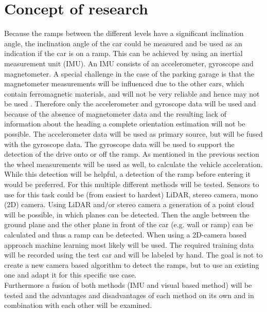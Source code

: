 \documentclass{paper}
\begin{document}
\section{Concept of research}
Because the ramps between the different levels have a significant inclination angle, the inclination angle of the car could be measured and be used as an indication if the car is on a ramp. This can be achieved by using an inertial measurement unit (IMU). An IMU consists of an accelerometer, gyroscope and magnetometer. A special challenge in the case of the parking garage is that the magnetometer measurements will be influenced due to the other cars, which contain ferromagnetic materials, and will not be very reliable and hence may not be used \cite{6418880}.
Therefore only the accelerometer and gyroscope data will be used and because of the absence of magnetometer data and the resulting lack of information about the heading a complete orientation estimation will not be possible. The accelerometer data will be used as primary source, but will be fused with the gyroscope data. The gyroscope data will be used to support the detection of the drive onto or off the ramp. As mentioned in the previous section the wheel measurements will be used as well, to calculate the vehicle acceleration.\\
While this detection will be helpful, a detection of the ramp before entering it would be preferred. For this multiple different methods will be tested. Sensors to use for this task could be (from easiest to hardest) LiDAR, stereo camera, mono (2D) camera. Using LiDAR and/or stereo camera a generation of a point cloud will be possible, in which planes can be detected. Then the angle between the ground plane and the other plane in front of the car (e.g. wall or ramp) can be calculated and thus a ramp can be detected. When using a 2D-camera based approach machine learning most likely will be used. The required training data will be recorded using the test car and will be labeled by hand. The goal is not to create a new camera based algorithm to detect the ramps, but to use an existing one and adapt it for this specific use case.\\
Furthermore a fusion of both methods (IMU and visual based method) will be tested and the advantages and disadvantages of each method on its own and in combination with each other will be examined.
\end{document}

